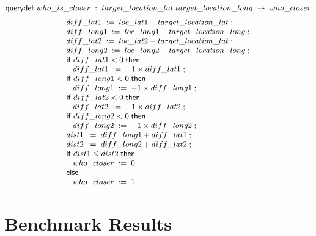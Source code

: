 $$ \squerydefk \; who\text{\_}is\text{\_}closer \;
: \;target\text{\_}location\text{\_}lat\;target\text{\_}location\text{\_}long \; \ra \;
who\text{\_}closer$$
\begin{displaymath}{\small
\begin{array}{l}
  \sassign{diff\text{\_}lat1}{\ebinop{-}{loc\text{\_}lat1}{target\text{\_}location\text{\_}lat}}\;
  ;\\
  \sassign{diff\text{\_}long1}{\ebinop{-}{loc\text{\_}long1}{target\text{\_}location\text{\_}long}}\;
  ;\\
  \sassign{diff\text{\_}lat2}{\ebinop{-}{loc\text{\_}lat2}{target\text{\_}location\text{\_}lat}}\;
  ;\\
  \sassign{diff\text{\_}long2}{\ebinop{-}{loc\text{\_}long2}{target\text{\_}location\text{\_}long}}\;
  ;\\
  \sifk \; \lreln{<}{diff\text{\_}lat1}{0} \; \sthenk\\
  \;\;\;\sassign{diff\text{\_}lat1}{\ebinop{\times}{-1}{diff\text{\_}lat1}}\;
  ;\\
  \sifk \; \lreln{<}{diff\text{\_}long1}{0} \; \sthenk\\
  \;\;\;\sassign{diff\text{\_}long1}{\ebinop{\times}{-1}{diff\text{\_}long1}}\;
  ;\\
  \sifk \; \lreln{<}{diff\text{\_}lat2}{0} \; \sthenk\\
  \;\;\;\sassign{diff\text{\_}lat2}{\ebinop{\times}{-1}{diff\text{\_}lat2}}\;
  ;\\
  \sifk \; \lreln{<}{diff\text{\_}long2}{0} \; \sthenk\\
  \;\;\;\sassign{diff\text{\_}long2}{\ebinop{\times}{-1}{diff\text{\_}long2}}\;
  ;\\
  \sassign{dist1}{\ebinop{+}{diff\text{\_}long1}{diff\text{\_}lat1}}\;
  ;\\
  \sassign{dist2}{\ebinop{+}{diff\text{\_}long2}{diff\text{\_}lat2}}\;
  ;\\
  \sifk \; \lreln{\leq}{dist1}{dist2} \; \sthenk\\
  \;\;\;\sassign{who\text{\_}closer}{0}\\
  \selsek\\
  \;\;\;\sassign{who\text{\_}closer}{1}\\
\end{array}
}
\end{displaymath}


\section{Benchmark Results}

